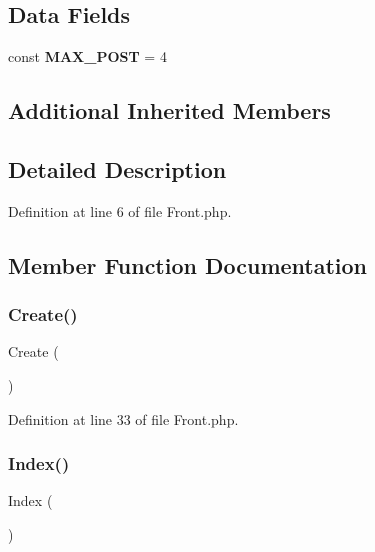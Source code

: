 \subsection*{Data Fields}
\begin{DoxyCompactItemize}
\item 
const \textbf{ M\+A\+X\+\_\+\+P\+O\+ST} = 4
\end{DoxyCompactItemize}
\subsection*{Additional Inherited Members}


\subsection{Detailed Description}


Definition at line 6 of file Front.\+php.



\subsection{Member Function Documentation}
\mbox{\label{class_src_1_1_controllers_1_1_front_ad01f71fa0ecc039494e3c282864298c3}} 
\subsubsection{Create()}
{\footnotesize\ttfamily Create (\begin{DoxyParamCaption}{ }\end{DoxyParamCaption})}



Definition at line 33 of file Front.\+php.

\mbox{\label{class_src_1_1_controllers_1_1_front_ac36db983080e1b0934908febca5de2d9}} 
\subsubsection{Index()}
{\footnotesize\ttfamily Index (\begin{DoxyParamCaption}{ }\end{DoxyParamCaption})}



